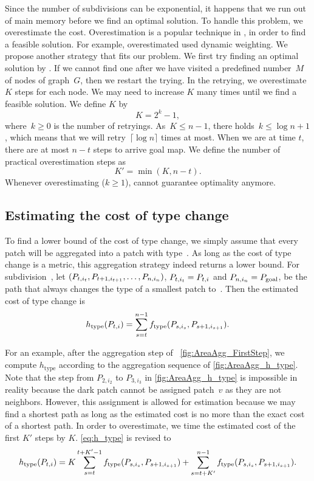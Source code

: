 Since the number of subdivisions can be exponential, 
it happens that we run out of main memory 
before we find an optimal solution. 
To handle this problem, we overestimate the cost. 
Overestimation is a popular technique in \Astar,
in order to find a feasible solution. 
For example, \citet{Pohl1973} overestimated used dynamic 
weighting. 
We propose another strategy that fits our problem. 
We first try finding an optimal solution by \Astar. 
If we cannot find one after 
we have visited a predefined number~$M$ of nodes of graph~$G$,
then we restart the trying.
In the retrying, we overestimate $K$ steps for each node.
We may need to increase $K$ many times 
until we find a feasible solution.
We define $K$ by
\[
K= 2^k -1,
\]
where~$k\ge 0$ is the number of retryings.
As~$K \le n-1$, there holds~$k \le \log n +1$, 
which means  that we will 
retry~$\lceil \log n\rceil$ times at most.
When we are at time $t$, there are at most $n-t$ steps 
to arrive goal map.
We define the number of practical overestimation steps as
\[
K'= \min(K, n-t).
\]
Whenever overestimating ($k\geq1$), 
\Astar cannot guarantee optimality anymore.


\subsection{Estimating the cost of type change}
\label{sec:AreaAgg_h_type}

To find a lower bound of the cost of type change, 
we simply assume that 
every patch will be aggregated into a patch with type~\Tgoal.
As long as the cost of type change is a metric, this aggregation 
strategy indeed returns a lower bound.
%
For subdivision~\Pnode, let
$(P_{t,i_t}, P_{t+1,i_{t+1}}, \dots,P_{n,i_n})$, 
$P_{t,i_t}=P_{t,i}$ and $P_{n,i_n}=P_\mathrm{goal}$,
be the path that always changes the type of a smallest patch 
to~\Tgoal.
Then the estimated cost of type change is
\begin{equation}
	\label{eq:h_type}
	h_\mathrm{type}(P_{t,i})=
\sum_{s=t}^{n-1}f_\mathrm{type}(P_{s,i_s},P_{s+1,i_{s+1}}).
\end{equation}

For an example, after the aggregation step of 
~\ref{fig:AreaAgg_FirstStep}, we compute $h_\mathrm{type}$ 
according to the aggregation sequence of 
\fig\ref{fig:AreaAgg_h_type}.
Note that the step from $P_{2,i_2}$ to 
$P_{3,i_3}$ 
in 
\fig\ref{fig:AreaAgg_h_type} is impossible in reality 
because the dark patch cannot be assigned patch~$v$
as they are not neighbors. 
However, this assignment is allowed for estimation 
because we may find a shortest path as long as 
the estimated cost is no more than 
the exact cost of a shortest path.
In order to overestimate, we time the estimated cost of the 
first $K'$ steps by $K$.
\fo\ref{eq:h_type} is revised to
\begin{equation}
\label{eq:o_type}
h_\mathrm{type}(P_{t,i})=
K\sum_{s=t}^{t+K'-1}f_\mathrm{type}(P_{s,i_s},P_{s+1,i_{s+1}})+
\sum_{s=t+K'}^{n-1}f_\mathrm{type}(P_{s,i_s},P_{s+1,i_{s+1}}).
\end{equation}


